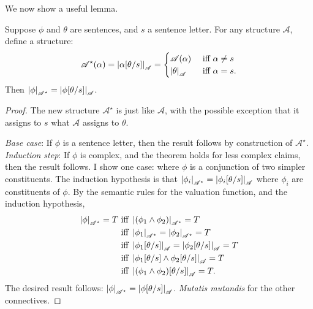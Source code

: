 We now show a useful lemma. \begin{lemma}[Substitution]\label{sublem}
	Suppose $\phi$ and $\theta$ are sentences, and $s$ a sentence letter. For any structure $\mathscr{A}$, define a structure: $$\mathscr{A}^{\star}(\alpha) = 	\left|\alpha[\theta/s]\right|_{\mathscr{A}} = \begin{cases} \mathscr{A}(\alpha) &\text{ iff } \alpha \neq s \\
	\left|\theta\right|_{\mathscr{A}} &\text{ iff } \alpha = s.
		\end{cases}$$ Then $\left|\phi\right|_{\mathscr{A^{\star}}}= \left|\phi[\theta/s]\right|_{\mathscr{A}}$. 
\begin{proof}	The new structure $\mathscr{A}^{\star}$ is just like $\mathscr{A}$, with the possible exception that it assigns to $s$ what $\mathscr{A}$ assigns to $\theta$.

\emph{Base case}: If $\phi$ is a sentence letter, then the result follows by construction of $\mathscr{A}^{\star}$.\\
		\emph{Induction step}: If $\phi$ is complex, and the theorem holds for less complex claims, then the result follows. I show one case: where $\phi$ is a conjunction of two simpler constituents. The induction hypothesis is that  $\left|\phi_{i}\right|_{\mathscr{A^{\star}}} = \left|\phi_{i}[\theta/s]\right|_{\mathscr{A}}$ where $\phi_{i}$ are constituents of $\phi$.
By the semantic rules for the valuation function, and the induction hypothesis, \begin{align*}
	\left|\phi\right|_{\mathscr{A^{\star}}} = T &\text{ iff } \left|(\phi_{1} \wedge \phi_{2})\right|_{\mathscr{A^{\star}}} = T\\ &\text{ iff } \left|\phi_{1}\right|_{\mathscr{A^{\star}}}=\left|\phi_{2}\right|_{\mathscr{A^{\star}}}=T\\ &\text{ iff } \left|\phi_{1}[\theta/s]\right|_{\mathscr{A}}=\left|\phi_{2}[\theta/s]\right|_{\mathscr{A}}=T\\ &\text{ iff } \left|\phi_{1}[\theta/s] \wedge \phi_{2}[\theta/s]\right|_{\mathscr{A}}=T\\ &\text{ iff } \left|(\phi_{1} \wedge \phi_{2})[\theta/s]\right|_{\mathscr{A}}=T.
\end{align*}
The desired result follows: $\left|\phi\right|_{\mathscr{A^{\star}}} = \left|\phi[\theta/s]\right|_{\mathscr{A}}$. \emph{Mutatis mutandis} for the other connectives. 
\end{proof} 
\end{lemma}


